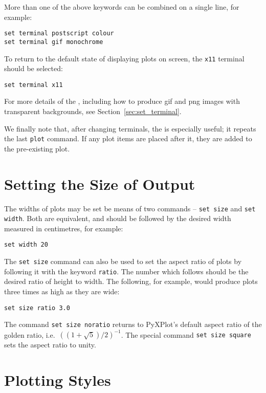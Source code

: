 More than one of the above keywords can be combined on a single line, for
example:

\begin{verbatim}
set terminal postscript colour
set terminal gif monochrome
\end{verbatim}

To return to the default state of displaying plots on screen, the {\tt x11}
terminal should be selected:

\begin{verbatim}
set terminal x11
\end{verbatim}

For more details of the , including how to produce gif
and png images with transparent backgrounds, see
Section~\ref{sec:set_terminal}.

We finally note that, after changing terminals, the  is
especially useful; it repeats the last {\tt plot} command. If any plot items
are placed after it, they are added to the pre-existing plot.

\section{Setting the Size of Output}

The widths of plots may be set be means of two commands -- {\tt set
size} and {\tt set width}. Both are
equivalent, and should be followed by the desired width measured in
centimetres, for example:

\begin{verbatim}
set width 20
\end{verbatim}

The {\tt set size} command can also be used to set the aspect ratio of plots by
following it with the keyword {\tt ratio}. The number
which follows should be the desired ratio of height to width. The following,
for example, would produce plots three times as high as they are wide:

\begin{verbatim}
set size ratio 3.0
\end{verbatim}

\noindent The command {\tt set size noratio} returns to PyXPlot's default
aspect ratio of the golden ratio, i.e.\ $\left((1+\sqrt{5})/2\right)^{-1}$. The
special command {\tt set size square} sets the aspect
ratio to unity.

\section{Plotting Styles}

